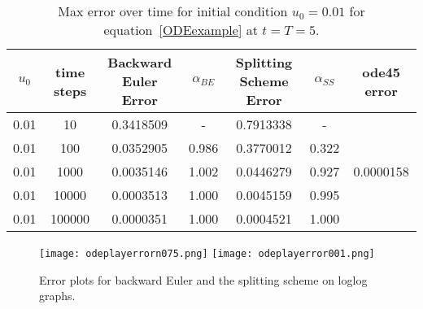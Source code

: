 \begin{table}[H]                                
\centering                                    
\begin{tabular}{|c|c|c|c|c|c||c|}               
\hline                                             
$u_0$ & time steps & Backward Euler Error & $\alpha_{BE}$ & Splitting Scheme Error & $\alpha_{SS}$ & ode45 error \\
\hline                                                
0.01 & 10 & 0.3418509 & - & 0.7913338 & - & \multirow{5}{*}{0.0000158} \\    
\hhline{------~}                                       
0.01 & 100 & 0.0352905 & 0.986 & 0.3770012 & 0.322 & \\         
\hhline{------~}                                               
0.01 & 1000 & 0.0035146 & 1.002 & 0.0446279 & 0.927 & \\       
\hhline{------~}                                      
0.01 & 10000 & 0.0003513 & 1.000 & 0.0045159 & 0.995 &  \\     
\hhline{------~}                   
0.01 & 100000 & 0.0000351 & 1.000 & 0.0004521 & 1.000 &  \\     
\hline                                         
\end{tabular}                                                   \caption{Max error over time for initial condition $u_0=0.01$ for equation~\eqref{ODEexample} at $t=T=5$.}               \label{table:erroru0p001}            
\end{table}   



		\begin{figure}[H]
		\centering
		\texttt{[image: odeplayerrorn075.png]}
        \texttt{[image: odeplayerror001.png]}
		\caption{Error plots for backward Euler and the splitting scheme on loglog graphs. }
		\label{fig:odeplayerror}
		\end{figure}



